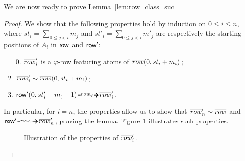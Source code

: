 We are now ready to prove Lemma~\ref{lem:row_class_suc}
\begin{proof}
We show that the following properties hold by induction on $0\leq i\leq n$, where 
$st_i=\sum_{0\leq j <i} m_j$ and $st'_i=\sum_{0\leq j <i} m'_j$ are respectively the starting positions of $A_i$ in $\text{{\sffamily row}}$ and $\text{{\sffamily row}}'$:
\begin{enumerate}
    \item[0.] $\overline{row}'_i$ is a $\varphi$-row featuring atoms of $\overline{row}(0, st_i+m_i)$;
	\item $\overline{row}'_i\sim \overline{row}(0, st_i+m_i)$;
	\item $\row'(0, st_i'+m_i'-1)\rownext \orow_i'$.
\end{enumerate}
In particular, for $i=n$, the properties allow us to show that $\overline{row}'_n\sim \overline{row}$ and $\row'\rownext \orow'_n$, proving the lemma.
Figure \ref{fig:generat} illustrates such properties.

\begin{figure}
    \caption{Illustration of the properties of $\overline{row}'_i$.}\label{fig:generat}
\end{figure}


\end{proof}
